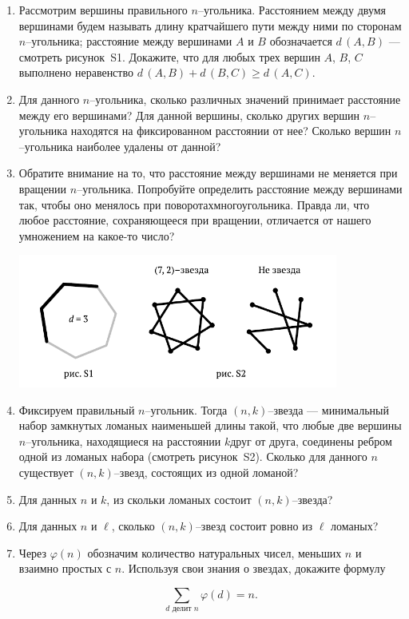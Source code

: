 ﻿
\begin{enumerate}

\item Рассмотрим вершины правильного $n$--угольника. Расстоянием между двумя вершинами будем называть длину кратчайшего пути между ними по сторонам $n$--угольника; расстояние между вершинами $A$ и $B$ обозначается $d\,(A,B)$ — смотреть рисунок~S1. Докажите, что для любых трех вершин $A$, $B$, $C$ выполнено неравенство $d\,(A,B) + d\,(B,C) \geq d\,(A,C)$.

\item Для данного $n$--угольника, сколько различных значений принимает расстояние между его вершинами? Для данной вершины, сколько других вершин $n$--угольника находятся на фиксированном расстоянии от нее? Сколько вершин $n$--угольника наиболее удалены от данной?

\item Обратите внимание на то, что расстояние между вершинами не меняется при вращении $n$--угольника. Попробуйте определить расстояние между вершинами так, чтобы оно менялось при поворотах\linebreak многоугольника. Правда ли, что любое расстояние, сохраняющееся при вращении, отличается от нашего умножением на какое-то число?


\vspace{-0.6cm}
\begin{center}
\includegraphics[width=10.5cm]{stats/2017/images/star_defs.pdf}
\end{center} \vspace{-0.7cm}

\item Фиксируем правильный $n$--угольник. Тогда $(n,k)$--звезда — минимальный набор замкнутых ломаных наименьшей длины такой, что любые две вершины $n$--угольника, находящиеся на расстоянии $k$\linebreak друг от друга, соединены ребром одной из ломаных набора (смотреть рисунок~S2). Сколько для данного $n$ существует $(n,k)$--звезд, состоящих из одной ломаной?

\item Для данных $n$ и $k$, из скольки ломаных состоит $(n,k)$--звезда?

\item Для данных $n$ и $\ell$, сколько $(n,k)$--звезд состоит ровно из $\ell$ ломаных?

\item Через $\varphi(n)$ обозначим количество натуральных чисел, меньших $n$ и взаимно простых с $n$. Используя свои знания о звездах, докажите формулу

$$\sum\limits_{d \text{ делит } n}\!\!\!\!\!\varphi(d) = n.$$
\end{enumerate}